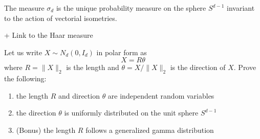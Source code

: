 \documentclass{article}
\begin{document}
\begin{prop}
  The measure $\sigma_{d}$ is the unique probability measure on the sphere
  $S^{d-1}$ invariant to the action of vectorial isometries.
\end{prop}

+ Link to the Haar measure

\begin{prop}[Exercise 3.3.7] Let us write $X \sim N_d\left(0, I_{d}\right)$ in
  polar  form as
  $$
  X=R \theta
  $$
  where $R=\|X\|_{2}$ is the length and $\theta=X /\|X\|_{2}$ is the direction
  of $X$. Prove the following:

  \begin{enumerate}
  \item the length $R$ and direction $\theta$ are independent random variables
  \item the direction $\theta$ is uniformly distributed on the unit sphere
    $S^{d-1}$
  \item (Bonus) the length $R$ follows a generalized gamma distribution
  \end{enumerate}
\end{prop}
\end{document}
